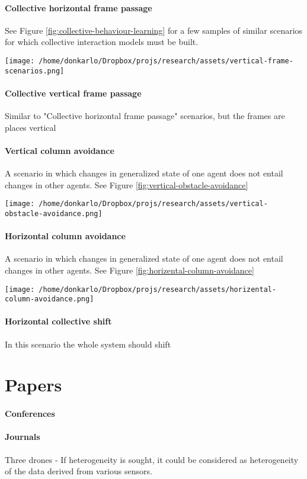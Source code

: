\documentclass{article}
\begin{document}
			\paragraph{Collective horizontal frame passage}
				See Figure \ref{fig:collective-behaviour-learning} for a few samples of similar scenarios for which collective interaction models must be built. 
				\begin{figure*}
					\centering
					\texttt{[image: /home/donkarlo/Dropbox/projs/research/assets/vertical-frame-scenarios.png]}
					\caption{Exemplary scenarios from which }
					\label{fig:collective-behaviour-learning}
				\end{figure*}
			\paragraph{Collective vertical frame passage}
				Similar to "Collective horizontal frame passage" scenarios, but the frames are places vertical
			\paragraph{Vertical column avoidance}
				A scenario in which changes in generalized state of one agent does not entail changes in other agents. See Figure \ref{fig:vertical-obstacle-avoidance}
				\begin{figure*}
					\centering
					\texttt{[image: /home/donkarlo/Dropbox/projs/research/assets/vertical-obstacle-avoidance.png]}
					\caption{Vertical obstacle avoidance}
					\label{fig:vertical-obstacle-avoidance}
				\end{figure*}
			\paragraph{Horizontal column avoidance}
				A scenario in which changes in generalized state of one agent does not entail changes in other agents. See Figure \ref{fig:horizental-column-avoidance}
				\begin{figure*}
					\centering
					\texttt{[image: /home/donkarlo/Dropbox/projs/research/assets/horizental-column-avoidance.png]}
					\caption{A scenario similar to Figure \ref{fig:vertical-obstacle-avoidance} from which collective behavior could be learned}
					\label{fig:horizental-column-avoidance}
				\end{figure*}
			
			\paragraph{Horizontal collective shift}
			In this scenario the whole system should shift
	
	\section{Papers}
		\paragraph{Conferences}
		\paragraph{Journals}
		
		Three drones - If heterogeneity is sought, it could be considered as heterogeneity of the data derived from various sensors.
	
\end{document}
